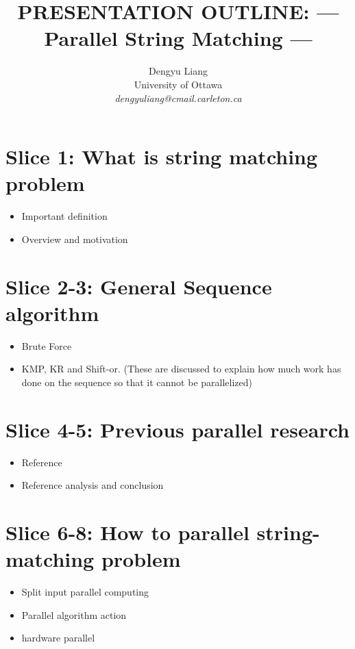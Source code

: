 \documentclass[11pt]{article}       %
\newenvironment{slide}[1]        {\section{#1} \begin{itemize}}%
                                 {\end{itemize}}
\begin{document}


\title{PRESENTATION OUTLINE: --- Parallel String Matching ---}


\author{
Dengyu Liang\\
University of Ottawa\\
{\em dengyuliang@cmail.carleton.ca}
} %

\maketitle

\begin{slide}{Slice 1: What is string matching problem}
\item Important definition
\item Overview and motivation
\end{slide}


\begin{slide}{Slice 2-3: General Sequence algorithm}
\item Brute Force
\item KMP, KR and Shift-or. (These are discussed to explain how much work has done on the sequence so that it cannot be parallelized)
\end{slide}

\begin{slide}{Slice 4-5: Previous parallel research}
\item Reference
\item Reference analysis and conclusion
\end{slide}

\begin{slide}{Slice 6-8: How to parallel string-matching problem}
\item Split input parallel computing
\item Parallel algorithm action
\item hardware parallel
\end{slide}
\end{document}
